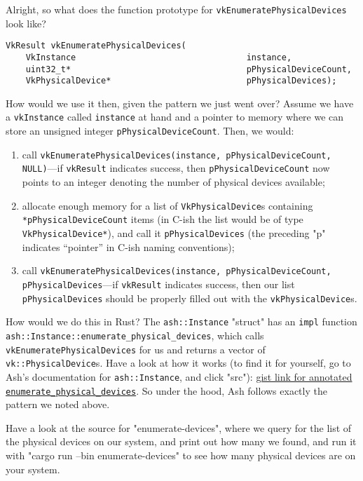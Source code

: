 \documentclass[12pt,letterpaper]{article}
\newcommand{\inquotes}[1]{``#1''}	%
\newcommand{\ril}[1]{\texttt{#1}}
\newcommand{\cil}[1]{\texttt{#1}}
\begin{document}
	Alright, so what does the function prototype for \cil{vkEnumeratePhysicalDevices} look like?
	\begin{verbatim}
VkResult vkEnumeratePhysicalDevices(
	VkInstance                                  instance,
	uint32_t*                                   pPhysicalDeviceCount,
	VkPhysicalDevice*                           pPhysicalDevices);
	\end{verbatim}
	How would we use it then, given the pattern we just went over? Assume we have a \cil{vkInstance} called \cil{instance} at hand and a pointer to memory where we can store an unsigned integer \cil{pPhysicalDeviceCount}. Then, we would:
		\begin{enumerate}
			\item call \cil{vkEnumeratePhysicalDevices(instance, pPhysicalDeviceCount, NULL)}---if \cil{vkResult} indicates success, then \cil{pPhysicalDeviceCount} now points to an integer denoting the number of physical devices available;
			
			\item allocate enough memory for a list of \cil{VkPhysicalDevice}s containing \cil{*pPhysicalDeviceCount} items (in C-ish the list would be of type \cil{VkPhysicalDevice*}), and call it \cil{pPhysicalDevices} (the preceding "p" indicates \inquotes{pointer} in C-ish naming conventions);
			
			\item call \cil{vkEnumeratePhysicalDevices(instance, pPhysicalDeviceCount, pPhysicalDevices}---if \cil{vkResult} indicates success, then our list \cil{pPhysicalDevices} should be properly filled out with the \cil{vkPhysicalDevice}s.
		\end{enumerate}
	
	How would we do this in Rust? The \ril{ash::Instance} "struct" has an \ril{impl} function \ril{ash::Instance::enumerate_physical_devices}, which calls \cil{vkEnumeratePhysicalDevices} for us and returns a vector of \ril{vk::PhysicalDevice}s. Have a look at how it works (to find it for yourself, go to Ash's documentation for \ril{ash::Instance}, and click "src"): \href{https://gist.github.com/bzm3r/175cd2b63db8f783ed968df20462be67}{gist link for annotated \texttt{enumerate\_physical\_devices}}. So under the hood, Ash follows exactly the pattern we noted above. 
	
	Have a look at the source for "enumerate-devices", where we query for the list of the physical devices on our system, and print out how many we found, and run it with "cargo run --bin enumerate-devices" to see how many physical devices are on your system.
	
\end{document}
